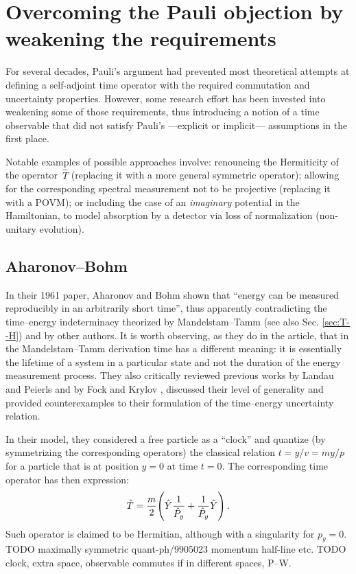 \section{Overcoming the Pauli objection by weakening the requirements}

For several decades, Pauli's argument had prevented most theoretical attempts at
defining a self-adjoint time operator with the required commutation and uncertainty properties.
However, some research effort has been invested
into weakening some of those requirements, thus
introducing a notion of a time observable that did not satisfy
Pauli's ---explicit or implicit--- assumptions in the first place.

Notable examples of possible approaches involve:
renouncing the Hermiticity of the operator~$\hat{T}$ (replacing it with a more general symmetric operator);
allowing for the corresponding spectral measurement not to be projective (replacing it with a POVM);
or including the case of an \emph{imaginary} potential in the Hamiltonian,
to model absorption by a detector via loss of normalization (non-unitary evolution).

\subsection{Aharonov--Bohm}

In their 1961 paper, Aharonov and Bohm \parencite{AharonovBohm}
shown that ``energy can be measured
  reproducibly in an arbitrarily short time'',
thus apparently contradicting the time--energy indeterminacy theorized
by Mandelstam--Tamm (see also Sec. \ref{sec:T--H}) and by other authors.
It is worth observing,
as they do in the article, that in the Mandelstam--Tamm derivation time has a different meaning:
it is essentially the lifetime of a system in a particular state
and not the duration of the energy measurement process.
They also critically reviewed previous works by Landau and Peierls \parencite{LandauPeierls}
and by Fock and Krylov \parencite{FockKrylov}, discussed their level of generality and provided
counterexamples to their formulation of the time--energy uncertainty relation.

In their model, they considered a free particle as a ``clock''
and quantize (by symmetrizing the corresponding operators)
the classical relation
$t = y / v = m y / p$ for a particle that is at position $y = 0$ at time $t = 0$.
The corresponding time operator has then expression:
\begin{equation}
  \hat{T} = \frac{m}{2} \qty( \hat{Y} \frac{1}{\hat{P}_y} + \frac{1}{\hat{P}_y} \hat{Y} ) \,\text{.}
\end{equation}
Such operator is claimed to be Hermitian, although with a singularity for $p_{y} = 0$.
TODO maximally symmetric quant-ph/9905023 momentum half-line etc.
TODO clock, extra space, observable commutes if in different spaces, P--W.

